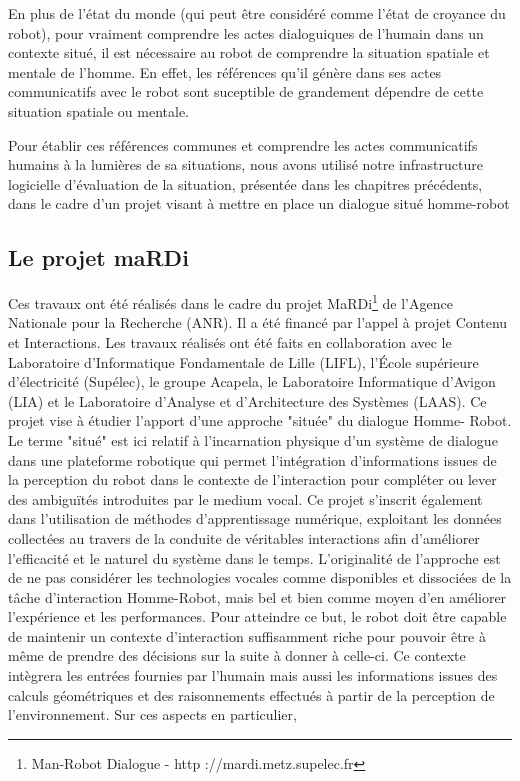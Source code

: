 \documentclass[a4paper,11pt,twoside]{StyleThese}
\begin{document}
En plus de l'état du monde (qui peut être considéré comme l'état de croyance du robot), pour vraiment comprendre les actes dialoguiques de l'humain dans un contexte situé, il est nécessaire au robot de comprendre la situation spatiale et mentale de l'homme. En effet, les références qu'il génère dans ses actes communicatifs avec le robot sont suceptible de grandement dépendre de cette situation spatiale ou mentale.

Pour établir ces références communes et comprendre les actes communicatifs humains à la lumières de sa situations, nous avons utilisé notre infrastructure logicielle d'évaluation de la situation, présentée dans les chapitres précédents, dans le cadre d'un projet visant à mettre en place un dialogue situé homme-robot


\subsection{Le projet maRDi}
Ces travaux ont été réalisés dans le cadre du projet MaRDi\footnote{Man-Robot Dialogue - http ://mardi.metz.supelec.fr
} de l’Agence Nationale pour la Recherche (ANR). Il a été financé par l’appel à projet Contenu et Interactions. Les
travaux réalisés ont été faits en collaboration avec le Laboratoire d’Informatique Fondamentale de Lille (LIFL), l’École supérieure d’électricité (Supélec), le groupe Acapela, le Laboratoire Informatique d’Avigon (LIA) et le Laboratoire d’Analyse et d’Architecture des Systèmes (LAAS).
Ce projet vise à étudier l’apport d’une approche "située" du dialogue Homme-
Robot. Le terme "situé" est ici relatif à l’incarnation physique d’un système de dialogue dans une plateforme robotique qui permet l’intégration d’informations issues de la perception du robot dans le contexte de l’interaction pour compléter ou lever des ambiguïtés introduites par le medium vocal. Ce projet s’inscrit également dans l’utilisation de méthodes d’apprentissage numérique, exploitant les données collectées au travers de la conduite de véritables interactions afin d’améliorer l’efficacité et le naturel du système dans le temps. L’originalité de l’approche est de ne pas considérer les technologies vocales comme disponibles et dissociées de la tâche d’interaction Homme-Robot, mais bel et bien comme moyen d’en améliorer l’expérience et les performances.
Pour atteindre ce but, le robot doit être capable de maintenir un contexte d’interaction suffisamment riche pour pouvoir être à même de prendre des décisions sur la suite à donner à celle-ci. Ce contexte intègrera les entrées fournies par l’humain mais aussi les informations issues des calculs géométriques et des raisonnements effectués à partir de la perception de l’environnement. Sur ces aspects en particulier,
\end{document}
